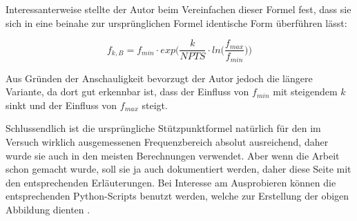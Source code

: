 {\begin{minipage}[t]{.30\textwidth}
        Interessanterweise stellte der Autor beim Vereinfachen dieser Formel fest,
        dass sie sich in eine beinahe zur urspr\"unglichen Formel identische Form
        \"uberf\"uhren l\"asst:

        \begin{equation*}
            f_{k,B} = f_{min} \cdot exp\Biggl(\frac{k}{NPTS} \cdot ln\biggl(\frac{f_{max}}{f_{min}}\biggr) \Biggr)
        \end{equation*}

        Aus  Gr\"unden  der  Anschauligkeit  bevorzugt der  Autor  jedoch  die
        l\"angere Variante, da  dort gut erkennbar ist, dass  der Einfluss von
        $f_{min}$  mit steigendem  $k$ sinkt  und der  Einfluss von  $f_{max}$
        steigt.

    \end{minipage}%
    \begin{minipage}[t]{.35\textwidth}
        \vspace{0em}
        \resizebox{\textwidth}{!}{}
        \label{fig:stuetzpunkte:high}
    \end{minipage}%
    \begin{minipage}[t]{.35\textwidth}
        \vspace{0em}
        \resizebox{\textwidth}{!}{}
        \label{fig:stuetzpunkte:low}
    \end{minipage}

    \hspace{-1.5em}
    \begin{minipage}[t]{\textwidth}
    Schlussendlich  ist  die  urspr\"ungliche  St\"utzpunktformel  nat\"urlich
    f\"ur  den  im  Versuch  wirklich  ausgemessenen  Frequenzbereich  absolut
    ausreichend,   daher  wurde   sie   auch  in   den  meisten   Berechnungen
    verwendet. Aber  wenn  die  Arbeit  schon   gemacht  wurde,  soll  sie  ja
    auch  dokumentiert  werden,  daher  diese  Seite  mit  den  entsprechenden
    Erl\"auterungen. Bei Interesse am Ausprobieren k\"onnen die entsprechenden
    Python-Scripts benutzt werden, welche  zur Erstellung der obigen Abbildung
    dienten \cite{ref:aw:github}.
    \end{minipage}


\clearpage
} %


